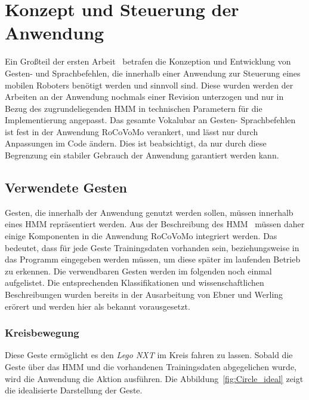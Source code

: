 \chapter{Konzept und Steuerung der Anwendung}
\label{chap:Konzept}

Ein Gro\ss teil der ersten Arbeit~\cite{bib:Ebner_Werling} betrafen die Konzeption und Entwicklung von Gesten- und Sprachbefehlen, die innerhalb einer Anwendung zur Steuerung eines mobilen Roboters ben\"otigt werden und sinnvoll sind. Diese wurden werden der Arbeiten an der Anwendung nochmals einer Revision unterzogen und nur in Bezug des zugrundeliegenden \gls{HMM} in technischen Parametern f\"ur die Implementierung angepasst.
\newline
Das gesamte Vokalubar an Gesten- Sprachbefehlen ist fest in der Anwendung RoCoVoMo verankert, und l\"asst nur durch Anpassungen im Code \"andern. Dies ist beabsichtigt, da nur durch diese Begrenzung ein stabiler Gebrauch der Anwendung garantiert werden kann.

\section{Verwendete Gesten}
Gesten, die innerhalb der Anwendung genutzt werden sollen, m\"ussen innerhalb eines \gls{HMM} repr\"asentiert werden. Aus der Beschreibung des \gls{HMM}~\cite{bib:Ebner_Werling} m\"ussen daher einige Komponenten in die Anwendung RoCoVoMo integriert werden. Das bedeutet, dass f\"ur jede Geste Trainingsdaten vorhanden sein, beziehungsweise in das Programm eingegeben werden m\"ussen, um diese sp\"ater im laufenden Betrieb zu erkennen.
\newline
Die verwendbaren Gesten werden im folgenden noch einmal aufgelistet. Die entsprechenden Klassifikationen und wissenschaftlichen Beschreibungen wurden bereits in der Ausarbeitung von Ebner und Werling~\cite{bib:Ebner_Werling} er\"orert und werden hier als bekannt vorausgesetzt.

\subsection{Kreisbewegung}
Diese Geste erm\"oglicht es den \textit{Lego NXT} im Kreis fahren zu lassen. Sobald die Geste \"uber das \gls{HMM} und die vorhandenen Trainingsdaten abgegelichen wurde, wird die Anwendung die Aktion ausf\"uhren. Die Abbildung~\ref{fig:Circle_ideal} zeigt die idealisierte Darstellung der Geste.

